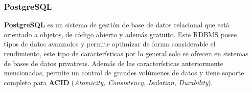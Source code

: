     \subsubsection{PostgreSQL}
    \textbf{PostgreSQL} es un sistema de gestión de base de datos relacional que está
    orientado a objetos, de código abierto y además gratuito. Este RDBMS posee tipos de
    datos avanzados y permite optimizar de forma considerable el rendimiento, este tipo de
    características por lo general solo se ofrecen en sistemas de bases de datos privativas.
    Además de las características anteriormente mencionadas, permite un control de grandes
    volúmenes de datos y tiene soporte completo para \textbf{ACID} (\textit{Atomicity,
    Consistency, Isolation, Durability}).
